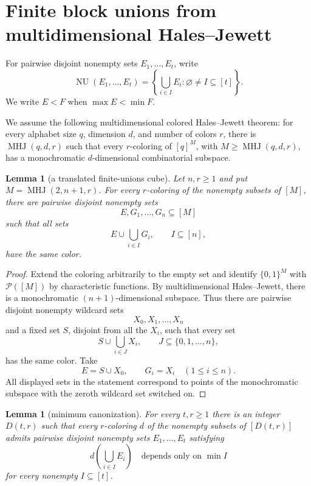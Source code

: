 \documentclass[11pt]{article}
\newtheorem{lemma}[theorem]{Lemma}
\theoremstyle{remark}
\newcommand{\cP}{\mathcal P}
\newcommand{\NU}{\operatorname{NU}}
\newcommand{\MHJ}{\operatorname{MHJ}}
\begin{document}
\section{Finite block unions from multidimensional Hales--Jewett}

For pairwise disjoint nonempty sets $E_1,\dots,E_t$, write
\[
  \NU(E_1,\dots,E_t)
  =\left\{\bigcup_{i\in I}E_i:
  \varnothing\ne I\subseteq[t]\right\}.
\]
We write $E<F$ when $\max E<\min F$.

We assume the following multidimensional colored Hales--Jewett theorem: for
every alphabet size $q$, dimension $d$, and number of colors $r$, there is
$\MHJ(q,d,r)$ such that every $r$-coloring of $[q]^M$, with
$M\ge\MHJ(q,d,r)$, has a monochromatic $d$-dimensional combinatorial
subspace.

\begin{lemma}[a translated finite-unions cube]\label{lem:translated-cube}
Let $n,r\ge1$ and put $M=\MHJ(2,n+1,r)$. For every $r$-coloring of the
nonempty subsets of $[M]$, there are pairwise disjoint nonempty sets
\[
  E,G_1,\dots,G_n\subseteq[M]
\]
such that all sets
\[
  E\cup\bigcup_{i\in I}G_i,
  \qquad I\subseteq[n],
\]
have the same color.
\end{lemma}

\begin{proof}
Extend the coloring arbitrarily to the empty set and identify
$\{0,1\}^M$ with $\cP([M])$ by characteristic functions. By
multidimensional Hales--Jewett, there is a monochromatic
$(n+1)$-dimensional subspace. Thus there are pairwise disjoint nonempty
wildcard sets
\[
  X_0,X_1,\dots,X_n
\]
and a fixed set $S$, disjoint from all the $X_i$, such that every set
\[
  S\cup\bigcup_{i\in J}X_i,
  \qquad J\subseteq\{0,1,\dots,n\},
\]
has the same color. Take
\[
  E=S\cup X_0,
  \qquad
  G_i=X_i\quad(1\le i\le n).
\]
All displayed sets in the statement correspond to points of the
monochromatic subspace with the zeroth wildcard set switched on.
\end{proof}

\begin{lemma}[minimum canonization]\label{lem:min-canonization}
For every $t,r\ge1$ there is an integer $D(t,r)$ such that every
$r$-coloring $d$ of the nonempty subsets of $[D(t,r)]$ admits pairwise
disjoint nonempty sets $E_1,\dots,E_t$ satisfying
\[
  d\left(\bigcup_{i\in I}E_i\right)
  \quad\text{depends only on }\min I
\]
for every nonempty $I\subseteq[t]$.
\end{lemma}
\end{document}

